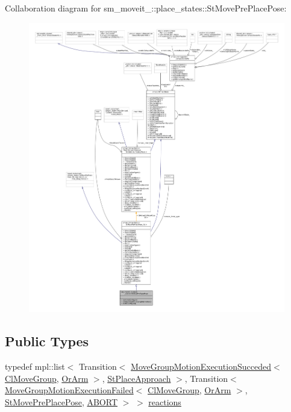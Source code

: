 Collaboration diagram for sm\+\_\+moveit\+\_\+:\+:place\+\_\+states\+:\+:St\+Move\+Pre\+Place\+Pose\+:
\nopagebreak
\begin{figure}[H]
\begin{center}
\leavevmode
\includegraphics[width=350pt]{structsm__moveit__3_1_1place__states_1_1StMovePrePlacePose__coll__graph}
\end{center}
\end{figure}
\subsection*{Public Types}
\begin{DoxyCompactItemize}
\item 
typedef mpl\+::list$<$ Transition$<$ \hyperlink{structmoveit__z__client_1_1MoveGroupMotionExecutionSucceded}{Move\+Group\+Motion\+Execution\+Succeded}$<$ \hyperlink{classmoveit__z__client_1_1ClMoveGroup}{Cl\+Move\+Group}, \hyperlink{classsm__moveit__3_1_1OrArm}{Or\+Arm} $>$, \hyperlink{structsm__moveit__3_1_1place__states_1_1StPlaceApproach}{St\+Place\+Approach} $>$, Transition$<$ \hyperlink{structmoveit__z__client_1_1MoveGroupMotionExecutionFailed}{Move\+Group\+Motion\+Execution\+Failed}$<$ \hyperlink{classmoveit__z__client_1_1ClMoveGroup}{Cl\+Move\+Group}, \hyperlink{classsm__moveit__3_1_1OrArm}{Or\+Arm} $>$, \hyperlink{structsm__moveit__3_1_1place__states_1_1StMovePrePlacePose}{St\+Move\+Pre\+Place\+Pose}, \hyperlink{classABORT}{A\+B\+O\+RT} $>$ $>$ \hyperlink{structsm__moveit__3_1_1place__states_1_1StMovePrePlacePose_ad37831708e351f14da0a830f0a115f2c}{reactions}
\end{DoxyCompactItemize}
